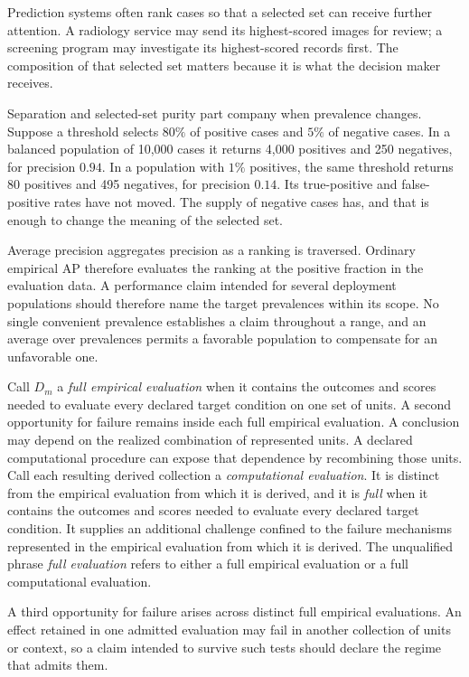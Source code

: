 \documentclass[11pt]{article}
\theoremstyle{remark}
\begin{document}
Prediction systems often rank cases so that a selected set can receive further
attention. A radiology service may send its highest-scored images for review;
a screening program may investigate its highest-scored records first. The
composition of that selected set matters because it is what the decision maker
receives.

Separation and selected-set purity part company when prevalence changes.
Suppose a threshold selects $80\%$ of positive cases and $5\%$ of negative
cases. In a balanced population of 10,000 cases it returns 4,000 positives and
250 negatives, for precision $0.94$. In a population with $1\%$ positives, the
same threshold returns 80 positives and 495 negatives, for precision $0.14$.
Its true-positive and false-positive rates have not moved. The supply of
negative cases has, and that is enough to change the meaning of the selected
set.

Average precision aggregates precision as a ranking is traversed. Ordinary
empirical AP therefore evaluates the ranking at the positive fraction in the
evaluation data. A performance claim intended for several deployment
populations should therefore name the target prevalences within its scope.
No single convenient prevalence establishes a claim throughout a range, and an
average over prevalences permits a favorable population to compensate for an
unfavorable one.

Call $D_m$ a \emph{full empirical evaluation} when it contains the outcomes and
scores needed to evaluate every declared target condition on one set of units.
A second opportunity for failure remains inside each full empirical
evaluation. A conclusion may depend on the realized combination of represented
units. A declared computational procedure can expose that dependence by recombining
those units. Call each resulting derived collection a \emph{computational
evaluation}. It is distinct from the empirical evaluation from which it is
derived, and it is \emph{full} when it contains the outcomes and scores needed
to evaluate every declared target condition. It supplies an additional
challenge confined to the failure mechanisms represented in the empirical
evaluation from which it is derived. The unqualified phrase \emph{full
evaluation} refers to either a full empirical evaluation or a full
computational evaluation.

A third opportunity for failure arises across distinct full empirical
evaluations. An effect retained in one admitted evaluation may fail in another
collection of units or context, so a claim intended to survive such tests should
declare the regime that admits them.
\end{document}

